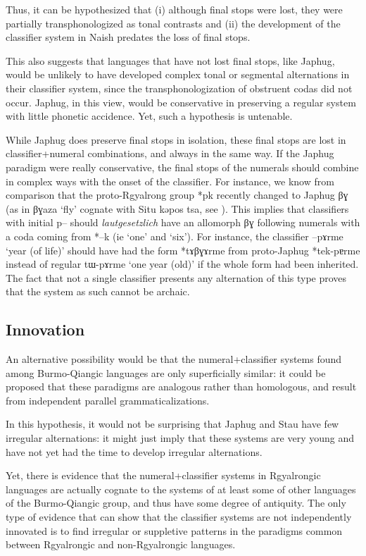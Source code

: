 \documentclass[oldfontcommands,oneside,a4paper,12pt]{article}
\newcommand{\ipa}[1]{{\phon#1}}
\begin{document}
Thus, it can be hypothesized that (i) although final stops were lost, they were partially transphonologized as tonal contrasts and (ii) the development of the classifier system in Naish predates the loss of final stops.

This also suggests that languages that have not lost final stops, like Japhug, would be unlikely to have developed complex tonal or segmental alternations in their classifier system, since the transphonologization of obstruent codas  did not occur.  Japhug, in this view, would be conservative in preserving a regular system with little phonetic accidence. Yet, such a hypothesis is untenable.  

While Japhug does preserve final stops in isolation, these final stops are lost in classifier+numeral combinations, and always in the same way. If the Japhug paradigm were really conservative, the final stops of the numerals should combine in complex ways with the onset of the classifier. For instance, we know from comparison that the proto-Rgyalrong group *\ipa{pk} recently changed to Japhug \ipa{βɣ} (as in \ipa{βɣaza} `fly' cognate with Situ \ipa{kəpos tsa}, see \citealt[272]{jacques04these}). This implies that classifiers with initial \ipa{p--} should  \textit{lautgesetzlich} have an allomorph \ipa{βɣ} following numerals with a coda coming from *\ipa{--k} (ie `one' and `six').  For instance, the classifier \ipa{--pɤrme} `year (of life)'  should have had the form  *\ipa{tɤβɣɤrme} from proto-Japhug *\ipa{tek-pɐrme}  instead of regular \ipa{tɯ-pɤrme} `one year (old)' if the whole form had been inherited. The fact that not a single classifier presents any alternation of this type proves that the system as such cannot be archaic.



\subsection{Innovation}
An alternative possibility would be that the numeral+classifier systems found among Burmo-Qiangic languages are only superficially similar: it could be proposed that these paradigms are analogous rather than homologous, and result from independent parallel grammaticalizations.

In this hypothesis, it would not be surprising that Japhug and Stau have few irregular alternations: it might just imply that these systems are very young and have not yet had the time to develop irregular alternations.

Yet,  there is  evidence that the numeral+classifier systems in Rgyalrongic languages are actually cognate to the systems of at least some of other languages of the Burmo-Qiangic group, and thus have some degree of antiquity. The only type of evidence that can show that the classifier systems are not independently innovated is to find irregular or suppletive patterns in the paradigms common between Rgyalrongic and non-Rgyalrongic languages.
\end{document}
